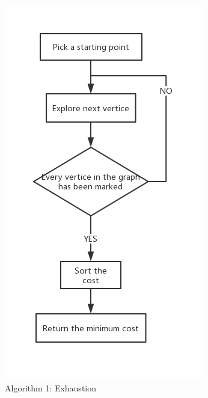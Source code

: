 \begin{itemize}
\begin{figure}[h]
\includegraphics[width=\linewidth]{Method1.jpg}
\caption{Algorithm 1: Exhaustion}
\label{fig2}
\end{figure}
\begin{figure}[h]

\end{figure}
\end{itemize}
